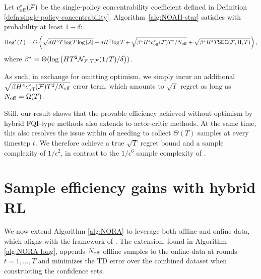 \begin{thm}
    Let $c_{{\operatorname{off}}}^*({\mathcal{F}})$ be the single-policy concentrability coefficient defined in Definition \ref{defn:single-policy-concentrability}. Algorithm~\ref{alg:NOAH-star} satisfies with probability at least $1-\delta$:
    \begin{align}
        \mathrm{Reg}^*(T)
        = O\left(\sqrt{d H^5 T \log T \log|{\mathcal{A}}|} + dH^3 \log T + \sqrt{\beta^* H^4 c_{{\operatorname{off}}}^*({\mathcal{F}})T^2/N_{{\operatorname{off}}}} + \sqrt{\beta^* H^4 T  \mathsf{SEC}({\mathcal{F}}, \Pi, T)}\right),
    \end{align}
    where  $\beta^* = \Theta(\log \left(HT^2 \mathcal{N}_{{\mathcal{F}},{\mathcal{T}} {\mathcal{F}}}(1/T) / \delta\right) )$.
    \label{thm:hybrid-noah-star}
\end{thm}
As such, in exchange for omitting optimism, we simply incur an additional $\sqrt{\beta H^4 c_{{\operatorname{off}}}^*({\mathcal{F}})T^2/N_{{\operatorname{off}}}}$ error term, which amounts to $\sqrt{T}$ regret as long as $N_{{\operatorname{off}}} = \Omega(T)$. 

Still, our result shows that the provable efficiency achieved without optimism by hybrid FQI-type methods \citep{song2023hybrid} also extends to actor-critic methods. At the same time, this also resolves the issue within \citet{zhou2023offline} of needing to collect $\Theta(T)$ samples at every timestep $t$. We therefore achieve a true $\sqrt{T}$ regret bound and a sample complexity of $1/\epsilon^2$, in contrast to the $1/\epsilon^6$ sample complexity of \citet{zhou2023offline}.




\section{Sample efficiency gains with hybrid RL}
We now extend Algorithm \ref{alg:NORA} to leverage both offline and online data, which aligns with the framework of \citet{tan2024natural}. The extension, found in Algorithm \ref{alg:NORA-long}, appends $N_{{\operatorname{off}}}$ offline samples to the online data at rounds $t=1,...,T$ and minimizes the TD error over the combined dataset when constructing the confidence sets. 

